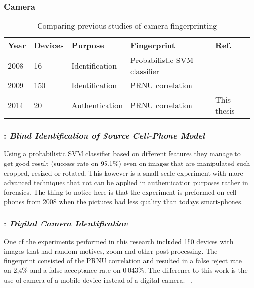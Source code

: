 \begin{table}[H]
\subsubsection*{Camera}\label{earlier:camera}
\centering
\begin{tabular}{| p{1cm} | p{1cm} | p{2.7cm} | p{3cm} | p{2.5cm} |}
  Year & Devices & Purpose & Fingerprint & Ref. \\ \hline
  2008 & 16 & Identification &  Probabilistic SVM classifier &~\cite{sensor:camera:blind} \\
  2009 & 150 & Identification & PRNU correlation &~\cite{sensor:camera:DCIdent} \\
  2014 & 20 & Authentication & PRNU correlation & This thesis \\ \hline
\end{tabular}
\caption[Table caption text]{Comparing previous studies of camera fingerprinting} \label{table:prevCamera}
\end{table}

\subsubsection*{\cite{sensor:camera:blind}: \textit{Blind Identification of Source Cell-Phone Model}}
Using a probabilistic SVM classifier based on different features they manage to get good result (success rate on 95.1\%) even on images that are manipulated such cropped, resized or rotated. This however is a small scale experiment with more advanced techniques that not can be applied in authentication purposes rather in forensics. The thing to notice here is that the experiment is preformed on cell-phones from 2008 when the pictures had less quality than todays smart-phones.
~\cite[]{sensor:camera:blind}

\subsubsection*{\cite{sensor:camera:DCIdent}: \textit{Digital Camera Identification}}
One of the experiments performed in this research included 150 devices with images that had random motives, zoom and other post-processing. The fingerprint consisted of the PRNU correlation and resulted in a false reject rate on 2,4\% and a false acceptance rate on 0.043\%. The difference to this work is the use of camera of a mobile device instead of a digital camera.
~\cite[]{sensor:camera:DCIdent}.